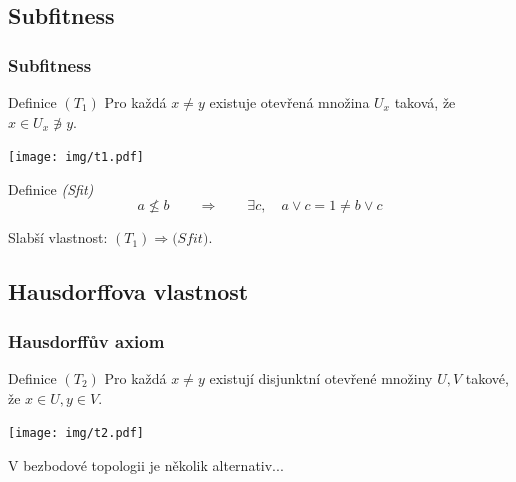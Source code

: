 \documentclass[mathserif]{beamer}
\begin{document}

\subsection{Subfitness}

\begin{frame}
\frametitle{Subfitness}

\begin{block}{Definice $(T_1)$}
  Pro každá $x \ne y$ existuje otevřená množina $U_x$ taková, že $x \in U_x
  \not\owns y$.
\end{block}

\begin{center}
  \texttt{[image: img/t1.pdf]}
\end{center}
\pause

\begin{block}{Definice \textit{(Sfit)}}
  \[
    a \not\le b \qquad \Rightarrow \qquad \exists c, \quad a \vee c = 1 \ne b
    \vee c
  \]
\end{block}
\pause

Slabší vlastnost: \alert{$(T_1) \Rightarrow \textit{(Sfit)}$.}
\end{frame}


\subsection{Hausdorffova vlastnost}

\begin{frame}
\frametitle{Hausdorffův axiom}

\begin{block}{Definice $(T_2)$}
  Pro každá $x \ne y$ existují \alert{disjunktní} otevřené množiny $U, V$
  takové, že $x \in U, y \in V$.
\end{block}

\begin{center}
  \texttt{[image: img/t2.pdf]}
\end{center}
\pause

V bezbodové topologii je několik alternativ...
\end{frame}

\end{document}
